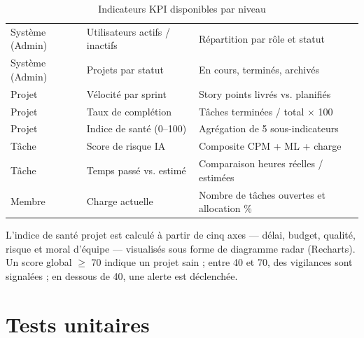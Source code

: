 \begin{table}[H]
  \centering
  \caption{Indicateurs KPI disponibles par niveau}
  \label{tab:kpi_niveaux}
  \begin{tabularx}{\textwidth}{L{3cm}L{5cm}X}
    \toprule
     &  &  \\
    \midrule
    Système (Admin) & Utilisateurs actifs / inactifs & Répartition par rôle et statut \\
    Système (Admin) & Projets par statut & En cours, terminés, archivés \\
    Projet          & Vélocité par sprint & Story points livrés vs. planifiés \\
    Projet          & Taux de complétion  & Tâches terminées / total × 100 \\
    Projet          & Indice de santé (0--100) & Agrégation de 5 sous-indicateurs \\
    Tâche           & Score de risque IA  & Composite CPM + ML + charge \\
    Tâche           & Temps passé vs. estimé & Comparaison heures réelles / estimées \\
    Membre          & Charge actuelle     & Nombre de tâches ouvertes et allocation \% \\
    \bottomrule
  \end{tabularx}
\end{table}

L'indice de santé projet est calculé à partir de cinq axes — délai, budget, qualité,
risque et moral d'équipe — visualisés sous forme de diagramme radar (Recharts). Un
score global $\geq$ 70 indique un projet sain ; entre 40 et 70, des vigilances sont
signalées ; en dessous de 40, une alerte est déclenchée.

\section{Tests unitaires}

